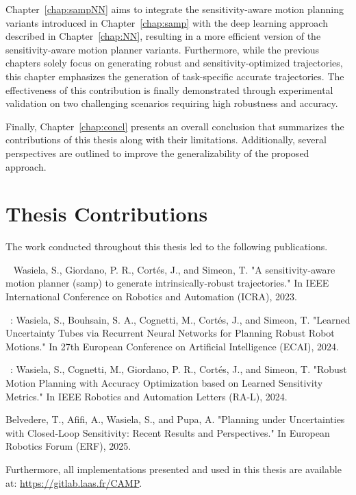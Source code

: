 Chapter~\ref{chap:sampNN} aims to integrate the sensitivity-aware motion planning variants introduced in Chapter~\ref{chap:samp} with the deep learning approach described in Chapter~\ref{chap:NN}, resulting in a more efficient version of the sensitivity-aware motion planner variants.
Furthermore, while the previous chapters solely focus on generating robust and sensitivity-optimized trajectories, this chapter emphasizes the generation of task-specific accurate trajectories.
The effectiveness of this contribution is finally demonstrated through experimental validation on two challenging scenarios requiring high robustness and accuracy.

Finally, Chapter~\ref{chap:concl} presents an overall conclusion that summarizes the contributions of this thesis along with their limitations.
Additionally, several perspectives are outlined to improve the generalizability of the proposed approach.

\section{Thesis Contributions}

The work conducted throughout this thesis led to the following publications. 

~\cite{cSAMP} Wasiela, S., Giordano, P. R., Cortés, J., and Simeon, T. "A sensitivity-aware motion planner (samp) to generate intrinsically-robust trajectories." In IEEE International Conference on Robotics and Automation (ICRA), 2023.

~\cite{cECAI}: Wasiela, S., Bouhsain, S. A., Cognetti, M., Cortés, J., and Simeon, T. "Learned Uncertainty Tubes via Recurrent Neural Networks for Planning Robust Robot Motions." In 27th European Conference on Artificial Intelligence (ECAI), 2024.

~\cite{cRAL}: Wasiela, S., Cognetti, M., Giordano, P. R., Cortés, J., and Simeon, T. "Robust Motion Planning with Accuracy Optimization based on Learned Sensitivity Metrics." In IEEE Robotics and Automation Letters (RA-L), 2024.

Belvedere, T., Afifi, A., Wasiela, S., and Pupa, A. "Planning under Uncertainties with Closed-Loop Sensitivity: Recent Results and Perspectives." In European Robotics Forum (ERF), 2025.

Furthermore, all implementations presented and used in this thesis are available at: \href{https://gitlab.laas.fr/CAMP}{https://gitlab.laas.fr/CAMP}.
